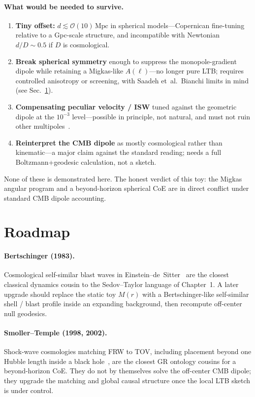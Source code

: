 \documentclass[11pt,a4paper]{article}
\begin{document}
\paragraph{What would be needed to survive.}
\begin{enumerate}[leftmargin=*,itemsep=2pt]
\item \textbf{Tiny offset:} $d\lesssim\mathcal{O}(10)\,\mathrm{Mpc}$ in
  spherical models---Copernican fine-tuning relative to a Gpc-scale structure,
  and incompatible with Newtonian $d/D\sim0.5$ if $D$ is cosmological.
\item \textbf{Break spherical symmetry} enough to suppress the monopole-gradient
  dipole while retaining a Migkas-like $A(\ell)$---no longer pure LTB; requires
  controlled anisotropy or screening, with Saadeh et~al.\ Bianchi limits in
  mind~\citep{Saadeh2016} (see Sec.~\ref{sec:roadmap}).
\item \textbf{Compensating peculiar velocity / ISW} tuned against the geometric
  dipole at the $10^{-3}$ level---possible in principle, not natural, and must
  not ruin other multipoles~\citep{Alnes2006}.
\item \textbf{Reinterpret the CMB dipole} as mostly cosmological rather than
  kinematic---a major claim against the standard reading; needs a full
  Boltzmann+geodesic calculation, not a sketch.
\end{enumerate}
None of these is demonstrated here. The honest verdict of this toy: the Migkas
angular program and a beyond-horizon spherical CoE are in direct conflict under
standard CMB dipole accounting.

\section{Roadmap}
\label{sec:roadmap}

\paragraph{Bertschinger (1983).}
Cosmological self-similar blast waves in Einstein--de~Sitter~\citep{Bertschinger1983}
are the closest classical dynamics cousin to the Sedov--Taylor language of
Chapter~1. A later upgrade should replace the static toy $M(r)$ with a
Bertschinger-like self-similar shell / blast profile inside an expanding
background, then recompute off-center null geodesics.

\paragraph{Smoller--Temple (1998, 2002).}
Shock-wave cosmologies matching FRW to TOV, including placement beyond one
Hubble length inside a black hole~\citep{SmollerTemple1998,SmollerTemple2002},
are the closest GR ontology cousins for a beyond-horizon CoE. They do not by
themselves solve the off-center CMB dipole; they upgrade the matching and
global causal structure once the local LTB sketch is under control.
\end{document}
